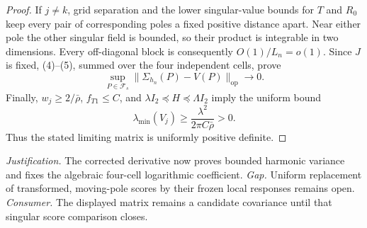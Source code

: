 \documentclass{article}
\begin{document}
\begin{proof}
If \(j\neq k\), grid separation and the lower singular-value bounds for \(T\) and \(R_0\) keep every pair of corresponding poles a fixed positive distance apart.  Near either pole the other singular field is bounded, so their product is integrable in two dimensions.  Every off-diagonal block is consequently \(O(1)/L_n=o(1)\).  Since \(J\) is fixed, (4)--(5), summed over the four independent cells, prove
\[
 \sup_{P\in\mathcal F_s}
 \|\Sigma_{h_n}(P)-V(P)\|_{\mathrm{op}}\longrightarrow0.             \tag{6}
\]
Finally, \(w_j\geq 2/\bar\rho\), \(f_{T1}\leq C\), and
\(\lambda I_2\preceq H\preceq\Lambda I_2\) imply the uniform bound
\[
 \lambda_{\min}(V_j)
 \geq\frac{\lambda^2}{2\pi C\bar\rho}>0.                            \tag{7}
\]
Thus the stated limiting matrix is uniformly positive definite.
\end{proof}
\par\smallskip\noindent \textit{Justification.} The corrected derivative now proves bounded harmonic variance and fixes the algebraic four-cell logarithmic coefficient. \textit{Gap.} Uniform replacement of transformed, moving-pole scores by their frozen local responses remains open. \textit{Consumer.} The displayed matrix remains a candidate covariance until that singular score comparison closes.
\end{document}
